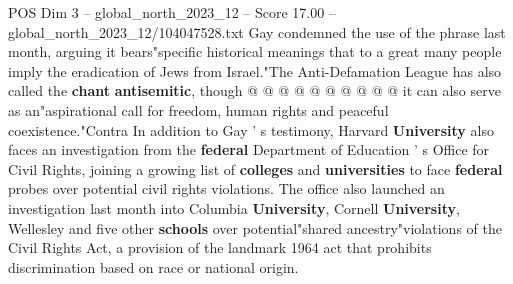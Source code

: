 \begin{textsample}{POS Dim 3 – global\_north\_2023\_12 – Score 17.00 – global\_north\_2023\_12/104047528.txt}
Gay condemned the use of the phrase last month, arguing it bears"specific historical meanings that to a great many people imply the eradication of Jews from Israel."The Anti-Defamation League has also called the \textbf{chant} \textbf{antisemitic}, though @ @ @ @ @ @ @ @ @ @ it can also serve as an"aspirational call for freedom, human rights and peaceful coexistence."Contra In addition to Gay ' s testimony, Harvard \textbf{University} also faces an investigation from the \textbf{federal} Department of Education ' s Office for Civil Rights, joining a growing list of \textbf{colleges} and \textbf{universities} to face \textbf{federal} probes over potential civil rights violations.
The office also launched an investigation last month into Columbia \textbf{University}, Cornell \textbf{University}, Wellesley and five other \textbf{schools} over potential"shared ancestry"violations of the Civil Rights Act, a provision of the landmark 1964 act that prohibits discrimination based on race or national origin.

\end{textsample}
